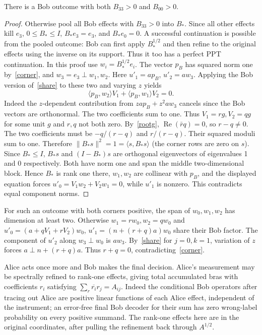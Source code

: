 \documentclass[11pt]{article}
\begin{document}
\begin{lemma}There is a Bob outcome with both $B_{33}>0$ and $B_{00}>0$.\end{lemma}
\begin{proof}Otherwise pool all Bob effects with $B_{33}>0$ into $B_*$. Since all other effects kill $e_3$, $0\le B_*\le I$, $B_*e_3=e_3$, and $B_*e_0=0$. A successful continuation is possible from the pooled outcome: Bob can first apply $B_*^{1/2}$ and then refine to the original effects using the inverse on its support. Thus it too has a perfect PPT continuation. In this proof use $w_i=B_*^{1/2}e_i$. The vector $p_B$ has squared norm one by~\eqref{corner}, and $w_3=e_3\perp w_1,w_2$. Here $u'_1=a p_B$, $u'_2=a w_3$. Applying the Bob version of~\eqref{share} to these two and varying $z$ yields
\[
        \langle p_B,w_2\rangle V_1+\langle p_B,w_1\rangle V_2=0.
\]
Indeed the $z$-dependent contribution from $z a p_B+z^2 a w_3$ cancels since the Bob vectors are orthonormal. The two coefficients sum to one. Thus $V_1=r g,V_2=q g$ for some unit $g$ and $r,q$ not both zero. By~\eqref{rootg}, $\operatorname{Re}(\bar r q)=0$, so $r-q\ne0$. The two coefficients must be $-q/(r-q)$ and $r/(r-q)$. Their squared moduli sum to one. Therefore $\|B_*s\|^2=1=\langle s,B_*s\rangle$ (the corner rows are zero on $s$). Since $B_*\le I$, $B_*s$ and $(I-B_*)s$ are orthogonal eigenvectors of eigenvalues 1 and 0 respectively. Both have norm one and span the middle two-dimensional block. Hence $B_*$ is rank one there, $w_1,w_2$ are collinear with $p_B$, and the displayed equation forces $u'_0=V_1w_2+V_2w_1=0$, while $u'_1$ is nonzero. This contradicts equal component norms.\end{proof}

For such an outcome with both corners positive, the span of $w_0,w_1,w_2$ has dimension at least two. Otherwise $w_1=r w_0,w_2=q w_0$ and $u'_0=(a+q V_1+r V_2)w_0$, $u'_1=(n+(r+q)a)w_0$ share their Bob factor. The component of $u'_2$ along $w_3\perp w_0$ is $a w_3$. By~\eqref{share} for $j=0,k=1$, variation of $z$ forces $a\perp n+(r+q)a$. Thus $r+q=0$, contradicting~\eqref{corner}.

Alice acts once more and Bob makes the final decision. Alice's measurement may be spectrally refined to rank-one effects, giving total accumulated bras with coefficients $r_i$ satisfying $\sum_r\overline{r_i}r_j=A_{ij}$. Indeed the conditional Bob operators after tracing out Alice are positive linear functions of each Alice effect, independent of the instrument; an error-free final Bob decoder for their sum has zero wrong-label probability on every positive summand. The rank-one effects here are in the original coordinates, after pulling the refinement back through $A^{1/2}$.
\end{document}
